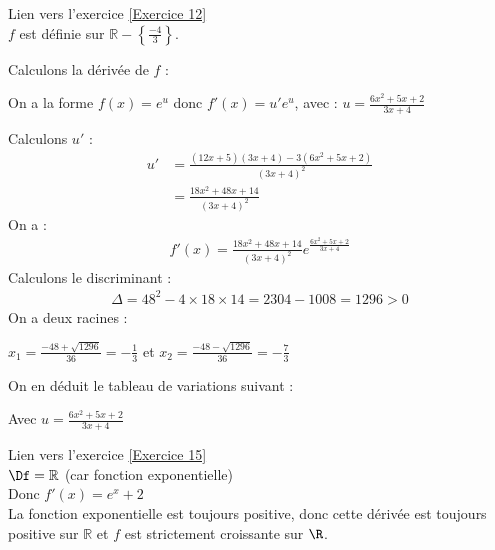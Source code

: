\documentclass[12pt,fleqn]{report} %
\begin{document}
\begin{correction}Lien vers l'exercice   \ref{Exercice 12}\\
	
	$f$ est définie sur $\mathbb{R}-\left\lbrace\frac{-4}{3}\right\rbrace$.
	
	Calculons la dérivée de $f$ : 
	
	On a la forme $f(x)=e^u$ donc $f'(x)=u'e^u$, avec : $u=\frac{6x^2+5x+2}{3x+4}$
	
	Calculons $u'$ :
	\begin{align*}
	u' & = \frac{(12x+5)(3x+4)-3(6x^2+5x+2)}{(3x+4)^2} \\ & = \frac{18x^2+48x+14}{(3x+4)^2}
	\end{align*}
	On a : 
	\begin{align*}
	f'(x) = \frac{18x^2+48x+14}{(3x+4)^2}e^{\frac{6x^2+5x+2}{3x+4}}
	\end{align*}
	Calculons le discriminant : 
	\begin{align*}
	\Delta = 48^2-4\times 18\times 14= 2304-1008=1296>0
	\end{align*}
	On a deux racines : 
	\begin{center}
		$x_1=\frac{-48+\sqrt{1296}}{36} = -\frac{1}{3}$ et $x_2=\frac{-48-\sqrt{1296}}{36} = -\frac{7}{3}$
	\end{center}
	On en déduit le tableau de variations suivant :
	\begin{center}
	\end{center}
	Avec $u=\frac{6x^2+5x+2}{3x+4}$	
\end{correction}

\begin{correction}Lien vers l'exercice   \ref{Exercice 15}\text{ }\\
	$\Df = \mathbb{R}$ (car fonction exponentielle) \\ [2mm]
	Donc $f'(x)= e^x+2$ \\ [2mm]
	La fonction exponentielle est toujours positive, donc cette dérivée est toujours positive sur  $\mathbb{R}$ et $f$ est strictement croissante sur $\R$.
\end{correction}
\end{document}
